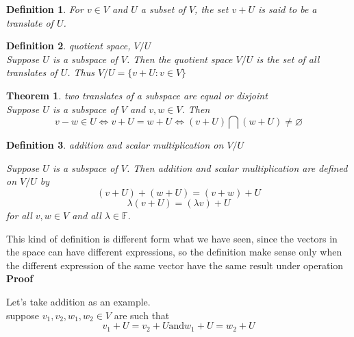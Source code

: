 \documentclass{article}
\newtheorem{theorem}{Theorem}[subsection]
\newtheorem{definition}{Definition}[subsection]
\newenvironment{cproof}{%
{
    \textbf{Proof\\}
    }
}{
}
\newcommand{\FF}{\mathbb{F}}
\begin{document}
\begin{CJK}{UTF8}{gkai}
\begin{definition}
    For $v \in V$ and $U$ a subset of $V$, the set $v + U$ is said to be a translate of $U$.\\
\end{definition}

\begin{definition}
    quotient space, $V/U$\\

    Suppose $U$ is a subspace of $V$. Then the quotient space $V/U$ is the set of all translates of $U$. Thus $V/U =\{v+ U : v\in V\}$\\
\end{definition}

\begin{theorem}
    two translates of a subspace are equal or disjoint\\

    Suppose $U$ is a subspace of $V$ and $v,w \in V$. Then
    \[v - w \in U \Leftrightarrow v + U = w + U \Leftrightarrow (v + U ) \bigcap( w + U) \neq \varnothing\]
\end{theorem}

\begin{definition}
    addition and scalar multiplication on $V/U$

    Suppose $U$ is a subspace of $V$. Then addition and scalar multiplication are defined on $V/U$ by 
    \[(v +U)+(w+U)=(v+w)+U\]
    \[\lambda(v +U) = (\lambda v)+U\]
    for all $v,w \in V$ and all $\lambda \in \FF$.\\
    
\end{definition}

This kind of definition is different form what we have seen, since the vectors in the space can have different expressions, so the definition make sense only when the different expression of the same vector have the same result under operation\\

\begin{cproof}
    Let's take addition as an example.\\

    suppose $v_1,v_2,w_1,w_2 \in V$ are such that
    \[v_1 +U =v_2+U \text{and} w_1+U=w_2+U\]


\end{cproof}
\end{CJK}
\end{document}
